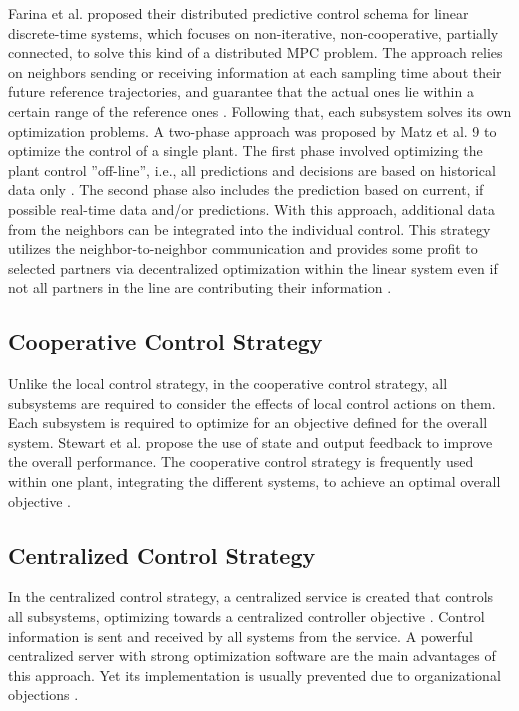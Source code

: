 Farina et al. \cite{farina2012distributed} proposed their distributed predictive control schema for linear discrete-time systems, which focuses on non-iterative, non-cooperative, partially connected, to solve this kind of a distributed MPC problem. The approach relies on neighbors sending or receiving information at each sampling time about their future reference trajectories, and guarantee that the actual ones lie within a certain range of the reference ones \cite{SEIT2017}. Following that, each subsystem solves its own optimization problems. A two-phase approach was proposed by Matz et al. 9 to optimize the control of a single plant. The first phase involved optimizing the plant control ”off-line”, i.e., all predictions and decisions are based on historical data only \cite{SEIT2017}. The second phase also includes the prediction based on current, if possible real-time data and/or predictions. With this approach, additional data from the neighbors can be integrated into the individual control. This strategy utilizes the neighbor-to-neighbor communication and provides some profit to selected partners via decentralized optimization within the linear system even if not all partners in the line are contributing their information \cite{SEIT2017}.
\subsection{Cooperative Control Strategy}
Unlike the local control strategy, in the cooperative control strategy, all subsystems are required to consider the effects of local control actions on them. Each subsystem is required to optimize for an objective defined for the overall system. Stewart et al. \cite{stewart2010cooperative} propose the use of state and output feedback to improve the overall performance. The cooperative control strategy is frequently used within one plant, integrating the different systems, to achieve an optimal overall objective \cite{SEIT2017,stewart2010cooperative}.
\subsection{Centralized Control Strategy}
In the centralized control strategy, a centralized service is created that controls all subsystems, optimizing towards a centralized controller objective \cite{SEIT2017}. Control information is sent and received by all systems from the service. A powerful centralized server with strong optimization software are the main advantages of this approach. Yet its implementation is usually prevented due to organizational objections \cite{stewart2010cooperative}.

